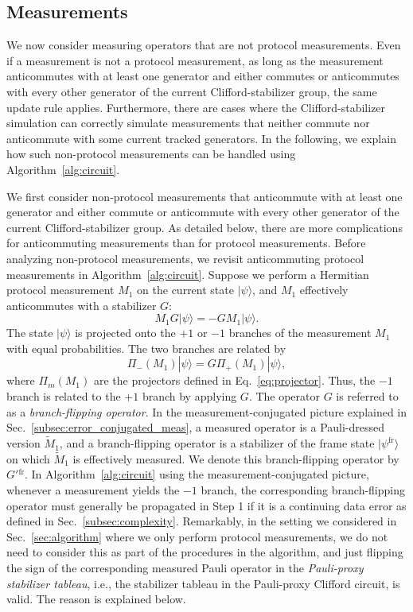 \documentclass[
 reprint,
 amsmath,amssymb,
 pra,superscriptaddress, nofootinbib
]{revtex4-2}
\theoremstyle{definition}
\theoremstyle{plain}
\begin{document}
\subsection{Measurements}
\label{subsec:new_measurement}
We now consider measuring operators that are not protocol measurements.
Even if a measurement is not a protocol measurement, as long as the measurement anticommutes with at least one generator and either commutes or anticommutes with every other generator of the current Clifford-stabilizer group, the same update rule applies. 
Furthermore, there are cases where the Clifford-stabilizer simulation can correctly simulate measurements that neither commute nor anticommute with some current tracked generators. 
In the following, we explain how such non-protocol measurements can be handled using Algorithm~\ref{alg:circuit}.

We first consider non-protocol measurements that anticommute with at least one generator and either commute or anticommute with every other generator of the current Clifford-stabilizer group. 
As detailed below, there are more complications for anticommuting measurements than for protocol measurements.
Before analyzing non-protocol measurements, we revisit anticommuting protocol measurements in Algorithm~\ref{alg:circuit}.
Suppose we perform a Hermitian protocol measurement $M_1$ on the current state $|\psi\rangle$, and $M_1$ effectively anticommutes with a stabilizer $G$:
\begin{equation}
    M_1G|\psi\rangle=-GM_1|\psi\rangle.
\end{equation}
The state $|\psi\rangle$ is projected onto the $+1$ or $-1$ branches of the measurement $M_1$ with equal probabilities. 
The two branches are related by 
\begin{equation}
    \Pi_-(M_1)|\psi\rangle=G\Pi_+(M_1)|\psi\rangle,
\end{equation}
where $\Pi_m(M_1)$ are the projectors defined in Eq.~\eqref{eq:projector}.
Thus, the $-1$ branch is related to the $+1$ branch by applying $G$.
The operator $G$ is referred to as a \emph{branch-flipping operator}.
In the measurement-conjugated picture explained in Sec.~\ref{subsec:error_conjugated_meas}, a measured operator is a Pauli-dressed version $\tilde{M}_1$, and a branch-flipping operator is a stabilizer of the frame state $|\psi^\mathrm{fr} \rangle$ on which $\tilde{M}_1$ is effectively measured. We denote this branch-flipping operator by $G'{^\mathrm{fr}}$. 
In Algorithm~\ref{alg:circuit} using the measurement-conjugated picture, whenever a measurement yields the $-1$ branch, the corresponding branch-flipping operator must generally be propagated in Step 1 if it is a continuing data error as defined in Sec.~\ref{subsec:complexity}.
Remarkably, in the setting we considered in Sec.~\ref{sec:algorithm} where we only perform protocol measurements, we do not need to consider this as part of the procedures in the algorithm, and just flipping the sign of the corresponding measured Pauli operator in the \emph{Pauli-proxy stabilizer tableau}, i.e., the stabilizer tableau in the Pauli-proxy Clifford circuit, is valid. 
The reason is explained below.
\end{document}
